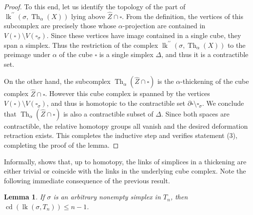 \documentclass[12pt, letterpaper]{article}
\newcommand{\Th}{\operatorname{Th}}
\renewcommand{\a}{\alpha}
\newcommand{\lk}{\operatorname{lk}}
\newcommand{\cdim}{\operatorname{cd}}
\theoremstyle{plain}
\newtheorem{lem}[thm]{Lemma}
\theoremstyle{definition}
\begin{document}
\begin{proof}
To this end, let us identify the topology of the part of $\lk^{\prime \prime}(\sigma, \Th_\alpha(X))$ lying above $\hat Z \cap \square$. From the definition, the vertices of this subcomplex are precisely those whose $\alpha$-projection are contained in $V(\square) \setminus V(\square_\sigma)$. Since these vertices have image contained in a single cube, they span a simplex. Thus the restriction of the complex $\lk^{\prime \prime}(\sigma, \Th_\alpha(X))$ to the preimage under $\a$ of the cube $\square$ is a single simplex $\Delta$, and thus it is a contractible set. 

On the other hand, the subcomplex $\Th_\alpha(\hat Z \cap \square)$ is the $\alpha$-thickening of the cube complex $\hat Z \cap \square$. However this cube complex is spanned by the vertices $V(\square) \setminus V(\square_\sigma)$, and thus is homotopic to the contractible set $\partial \square \setminus \square_\sigma$. We conclude that $\Th_\alpha(\hat Z \cap \square)$ is also a contractible subset of $\Delta$. Since both spaces are contractible, the relative homotopy groups all vanish and the desired deformation retraction exists. This completes the inductive step and verifies statement (3), completing the proof of the lemma.
\end{proof}

Informally,  shows that, up to homotopy, the links of simplices in a thickening are either trivial or coincide with the links in the underlying cube complex. Note the following immediate consequence of the previous result.

\begin{lem}\label{lem:cdim-of-links}
    If $\sigma$ is an arbitrary nonempty simplex in $T_n$, then $\cdim(\lk(\sigma, T_n)) \leq n-1$.
\end{lem}
\end{document}
